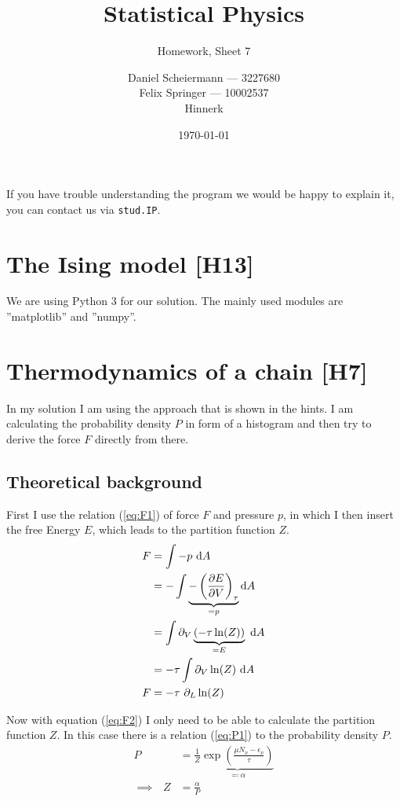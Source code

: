 \documentclass[a4paper,12pt]{scrartcl}
\title{Statistical Physics}
\subtitle{Homework, Sheet 7}
\author{Daniel Scheiermann --- 3227680 \\ Felix Springer --- 10002537 \\ Hinnerk}
\date{\today}
\begin{document}
\maketitle

If you have trouble understanding the program we would be happy to explain it, you can contact us via \texttt{stud.IP}.

\section{The Ising model [H13]}
We are using Python 3 for our solution. The mainly used modules are ''matplotlib'' and ''numpy''.

\section{Thermodynamics of a chain [H7]}
In my solution I am using the approach that is shown in the hints.
I am calculating the probability density $P$ in form of a histogram and then try to derive the force $F$ directly from there.

\subsection{Theoretical background}
First I use the relation (\ref{eq:F1}) of force $F$ and pressure $p$, in which I then insert the free Energy $E$, which leads to the partition function $Z$.
\begin{align}
	F &= \int - p \text{ d}A \label{eq:F1} \\
	&= - \int \underbrace{- \left( \frac{\partial E}{\partial V} \right)_{\tau}}_{= p} \text{d}A \notag \\
	&= \int \partial_V \underbrace{(- \tau \ln(Z))}_{= E} \text{ d}A \notag \\
	&= - \tau \int \partial_V \ln(Z) \text{ d}A \notag \\
	F &= - \tau \text{ } \partial_L \ln(Z) \label{eq:F2}
\end{align}

Now with equation (\ref{eq:F2}) I only need to be able to calculate the partition function $Z$.
In this case there is a relation (\ref{eq:P1}) to the probability density $P$.
\begin{align}
	P &= \frac{1}{Z} \underbrace{\exp \left( {\frac{\mu N_\nu - \epsilon_\nu}{\tau}} \right)}_{\eqqcolon \alpha} \label{eq:P1} \\
	\implies \text{ } Z &= \frac{\alpha}{P} \label{eq:Z1}
\end{align}
\end{document}
